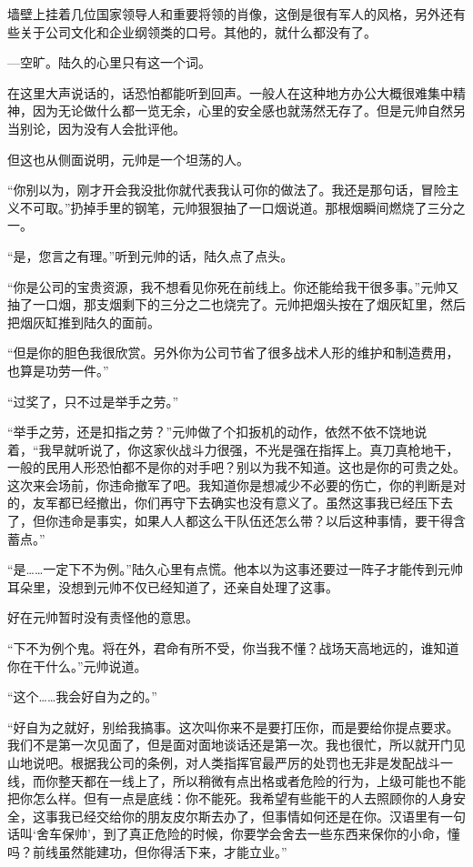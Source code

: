 墙壁上挂着几位国家领导人和重要将领的肖像，这倒是很有军人的风格，另外还有些关于公司文化和企业纲领类的口号。其他的，就什么都没有了。

---空旷。陆久的心里只有这一个词。

在这里大声说话的，话恐怕都能听到回声。一般人在这种地方办公大概很难集中精神，因为无论做什么都一览无余，心里的安全感也就荡然无存了。但是元帅自然另当别论，因为没有人会批评他。

但这也从侧面说明，元帅是一个坦荡的人。

“你别以为，刚才开会我没批你就代表我认可你的做法了。我还是那句话，冒险主义不可取。”扔掉手里的钢笔，元帅狠狠抽了一口烟说道。那根烟瞬间燃烧了三分之一。

“是，您言之有理。”听到元帅的话，陆久点了点头。

“你是公司的宝贵资源，我不想看见你死在前线上。你还能给我干很多事。”元帅又抽了一口烟，那支烟剩下的三分之二也烧完了。元帅把烟头按在了烟灰缸里，然后把烟灰缸推到陆久的面前。

“但是你的胆色我很欣赏。另外你为公司节省了很多战术人形的维护和制造费用，也算是功劳一件。”

“过奖了，只不过是举手之劳。”

“举手之劳，还是扣指之劳？”元帅做了个扣扳机的动作，依然不依不饶地说着，“我早就听说了，你这家伙战斗力很强，不光是强在指挥上。真刀真枪地干，一般的民用人形恐怕都不是你的对手吧？别以为我不知道。这也是你的可贵之处。这次来会场前，你违命撤军了吧。我知道你是想减少不必要的伤亡，你的判断是对的，友军都已经撤出，你们再守下去确实也没有意义了。虽然这事我已经压下去了，但你违命是事实，如果人人都这么干队伍还怎么带？以后这种事情，要干得含蓄点。”

“是……一定下不为例。”陆久心里有点慌。他本以为这事还要过一阵子才能传到元帅耳朵里，没想到元帅不仅已经知道了，还亲自处理了这事。

好在元帅暂时没有责怪他的意思。

“下不为例个鬼。将在外，君命有所不受，你当我不懂？战场天高地远的，谁知道你在干什么。”元帅说道。

“这个……我会好自为之的。”

“好自为之就好，别给我搞事。这次叫你来不是要打压你，而是要给你提点要求。我们不是第一次见面了，但是面对面地谈话还是第一次。我也很忙，所以就开门见山地说吧。根据我公司的条例，对人类指挥官最严厉的处罚也无非是发配战斗一线，而你整天都在一线上了，所以稍微有点出格或者危险的行为，上级可能也不能把你怎么样。但有一点是底线：你不能死。我希望有些能干的人去照顾你的人身安全，这事我已经交给你的朋友皮尔斯去办了，但事情如何还是在你。汉语里有一句话叫‘舍车保帅’，到了真正危险的时候，你要学会舍去一些东西来保你的小命，懂吗？前线虽然能建功，但你得活下来，才能立业。”

